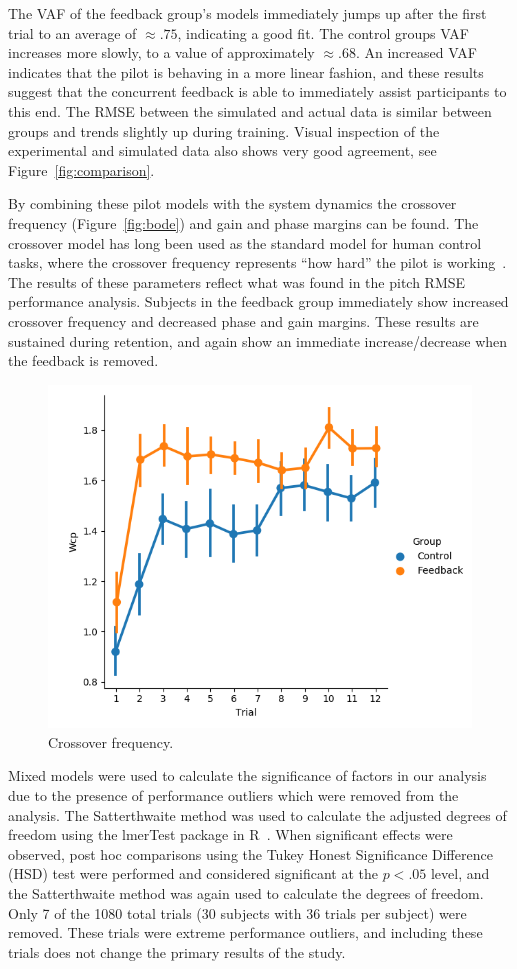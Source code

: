 The VAF of the feedback group's models immediately jumps up after the first trial to an average of $\approx.75$, indicating a good fit.
The control groups VAF increases more slowly, to a value of approximately $\approx.68$.
An increased VAF indicates that the pilot is behaving in a more linear fashion, and these results suggest that the concurrent feedback is able to immediately assist participants to this end.
The RMSE between the simulated and actual data is similar between groups and trends slightly up during training.
Visual inspection of the experimental and simulated data also shows very good agreement, see Figure~\ref{fig:comparison}.

By combining these pilot models with the system dynamics the crossover frequency (Figure~\ref{fig:bode}) and gain and phase margins can be found.
The crossover model has long been used as the standard model for human control tasks, where the crossover frequency represents ``how hard'' the pilot is working~\cite{mcruer_dynamic_1957}.
The results of these parameters reflect what was found in the pitch RMSE performance analysis.
Subjects in the feedback group immediately show increased crossover frequency and decreased phase and gain margins.
These results are sustained during retention, and again show an immediate increase/decrease when the feedback is removed.

\begin{figure}
    \centering
    \includegraphics[width=0.8\linewidth]{figures/model_Wcp.png}
    \caption[Crossover frequency]{Crossover frequency.}
    \label{fig:crossover}
\end{figure}

Mixed models were used to calculate the significance of factors in our analysis due to the presence of performance outliers which were removed from the analysis.
The Satterthwaite method was used to calculate the adjusted degrees of freedom using the lmerTest package in R~\cite{RN53}.
When significant effects were observed, post hoc comparisons using the Tukey Honest Significance Difference (HSD) test were performed and considered significant at the $p < .05$ level, and the Satterthwaite method was again used to calculate the degrees of freedom.
Only 7 of the 1080 total trials (30 subjects with 36 trials per subject) were removed.
These trials were extreme performance outliers, and including these trials does not change the primary results of the study.

